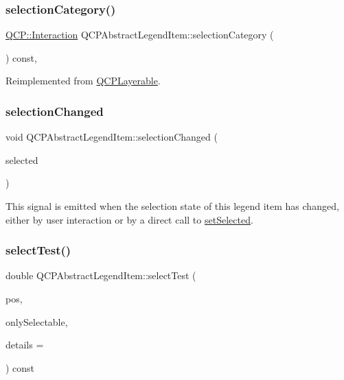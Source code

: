 \subsubsection{\texorpdfstring{selection\+Category()}{selectionCategory()}}
{\footnotesize\ttfamily \hyperlink{namespace_q_c_p_a2ad6bb6281c7c2d593d4277b44c2b037}{Q\+C\+P\+::\+Interaction} Q\+C\+P\+Abstract\+Legend\+Item\+::selection\+Category (\begin{DoxyParamCaption}{ }\end{DoxyParamCaption}) const\hspace{0.3cm}{\ttfamily [protected]}, {\ttfamily [virtual]}}



Reimplemented from \hyperlink{class_q_c_p_layerable_a908c9edda761886f33893be326dab77d}{Q\+C\+P\+Layerable}.

\mbox{\label{class_q_c_p_abstract_legend_item_a7cb61fdfbaf69c590bacb8f9e7099d9e}} 
\subsubsection{\texorpdfstring{selection\+Changed}{selectionChanged}}
{\footnotesize\ttfamily void Q\+C\+P\+Abstract\+Legend\+Item\+::selection\+Changed (\begin{DoxyParamCaption}\item[{bool}]{selected }\end{DoxyParamCaption})\hspace{0.3cm}{\ttfamily [signal]}}

This signal is emitted when the selection state of this legend item has changed, either by user interaction or by a direct call to \hyperlink{class_q_c_p_abstract_legend_item_a6eed93b0ab99cb3eabb043fb08179c2b}{set\+Selected}. \mbox{\label{class_q_c_p_abstract_legend_item_a80ec112a6608fc39dbed56239849b187}} 
\subsubsection{\texorpdfstring{select\+Test()}{selectTest()}}
{\footnotesize\ttfamily double Q\+C\+P\+Abstract\+Legend\+Item\+::select\+Test (\begin{DoxyParamCaption}\item[{const Q\+PointF \&}]{pos,  }\item[{bool}]{only\+Selectable,  }\item[{Q\+Variant $\ast$}]{details = {} }\end{DoxyParamCaption}) const\hspace{0.3cm}{\ttfamily [virtual]}}

